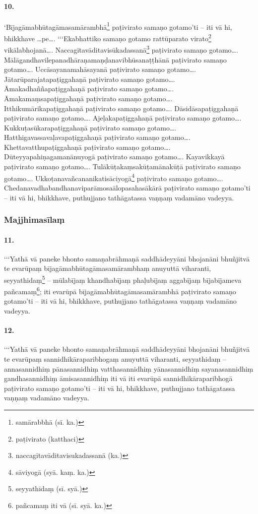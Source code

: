 \paragraph{10.}
‘Bījagāmabhūtagāmasamārambhā\footnote{samārabbhā (sī. ka.)} paṭivirato samaṇo gotamo’ti – iti vā hi, bhikkhave …pe…. ‘‘‘Ekabhattiko samaṇo gotamo rattūparato virato\footnote{paṭivirato (katthaci)} vikālabhojanā…. Naccagītavāditavisūkadassanā\footnote{naccagītavāditavisukadassanā (ka.)} paṭivirato samaṇo gotamo…. Mālāgandhavilepanadhāraṇamaṇḍanavibhūsanaṭṭhānā paṭivirato samaṇo gotamo…. Uccāsayanamahāsayanā paṭivirato samaṇo gotamo…. Jātarūparajatapaṭiggahaṇā paṭivirato samaṇo gotamo…. Āmakadhaññapaṭiggahaṇā paṭivirato samaṇo gotamo…. Āmakamaṃsapaṭiggahaṇā paṭivirato samaṇo gotamo…. Itthikumārikapaṭiggahaṇā paṭivirato samaṇo gotamo…. Dāsidāsapaṭiggahaṇā paṭivirato samaṇo gotamo…. Ajeḷakapaṭiggahaṇā paṭivirato samaṇo gotamo…. Kukkuṭasūkarapaṭiggahaṇā paṭivirato samaṇo gotamo…. Hatthigavassavaḷavapaṭiggahaṇā paṭivirato samaṇo gotamo…. Khettavatthupaṭiggahaṇā paṭivirato samaṇo gotamo…. Dūteyyapahiṇagamanānuyogā paṭivirato samaṇo gotamo…. Kayavikkayā paṭivirato samaṇo gotamo…. Tulākūṭakaṃsakūṭamānakūṭā paṭivirato samaṇo gotamo…. Ukkoṭanavañcananikatisāciyogā\footnote{sāviyogā (syā. kaṃ. ka.)} paṭivirato samaṇo gotamo…. Chedanavadhabandhanaviparāmosaālopasahasākārā paṭivirato samaṇo gotamo’ti – iti vā hi, bhikkhave, puthujjano tathāgatassa vaṇṇaṃ vadamāno vadeyya.


\subsubsection{Majjhimasīlaṃ}

\paragraph{11.}
‘‘‘Yathā vā paneke bhonto samaṇabrāhmaṇā saddhādeyyāni bhojanāni bhuñjitvā te evarūpaṃ bījagāmabhūtagāmasamārambhaṃ anuyuttā viharanti, seyyathidaṃ\footnote{seyyathīdaṃ (sī. syā.)} – mūlabījaṃ khandhabījaṃ phaḷubījaṃ aggabījaṃ bījabījameva pañcamaṃ\footnote{pañcamaṃ iti vā (sī. syā. ka.)}; iti evarūpā bījagāmabhūtagāmasamārambhā paṭivirato samaṇo gotamo’ti – iti vā hi, bhikkhave, puthujjano tathāgatassa vaṇṇaṃ vadamāno vadeyya.

\paragraph{12.}
‘‘‘Yathā vā paneke bhonto samaṇabrāhmaṇā saddhādeyyāni bhojanāni bhuñjitvā te evarūpaṃ sannidhikāraparibhogaṃ anuyuttā viharanti, seyyathidaṃ – annasannidhiṃ pānasannidhiṃ vatthasannidhiṃ yānasannidhiṃ sayanasannidhiṃ gandhasannidhiṃ āmisasannidhiṃ iti vā iti evarūpā sannidhikāraparibhogā paṭivirato samaṇo gotamo’ti – iti vā hi, bhikkhave, puthujjano tathāgatassa vaṇṇaṃ vadamāno vadeyya.

